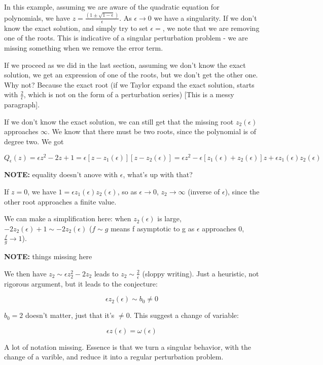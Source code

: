\documentclass[12pt]{report}
\begin{document}
In this example, assuming we are aware of the quadratic equation for
polynomials, we have $z = \frac{(1 \pm \sqrt{1-\epsilon})}{\epsilon}$. As
$\epsilon \to 0$ we have a singularity. If we don't know the exact solution, and
simply try to set $\epsilon=$, we note that we are removing one of the roots. This is indicative of a singular perturbation problem - we are missing something when we remove the error term.

If we proceed as we did in the last section, assuming we don't know the exact
solution, we get an expression of one of the roots, but we don't get the other
one. Why not? Because the exact root (if we Taylor expand the exact solution,
starts with $\frac 2 \epsilon$, which is not on the form of a perturbation
series) [This is a messy paragraph].

If we don't know the exact solution, we can still get that the missing root
$z_2(\epsilon)$ approaches $\infty$. We know that there must be two roots, since
the polynomial is of degree two. We got

$$Q_\epsilon(z) = \epsilon z^2 - 2z +1 = \epsilon[z - z_1(\epsilon)][z -
z_2(\epsilon)] = \epsilon z^2 - \epsilon [z_1(\epsilon) + z_2(\epsilon)]z +
\epsilon z_1(\epsilon)z_2(\epsilon)$$

\textbf{NOTE:} equality doesn't anove with $\epsilon$, what's up with that?

If $z=0$, we have $1 = \epsilon z_1(\epsilon) z_2(\epsilon)$, so as $\epsilon
\to 0$, $z_2 \to \infty$ (inverse of $\epsilon$), since the other root approaches a finite value.

We can make a simplification here: when $z_2(\epsilon)$ is large, $-2
z_2(\epsilon) + 1 \sim -2 z_2(\epsilon)$ ($f \sim g$ means f asymptotic to g as
$\epsilon$ approaches 0, $\frac f g \to 1$).

\textbf{NOTE: }things missing here

We then have $z_2 \sim \epsilon z_2^2 - 2 z_2$ leads to $z_2 \sim \frac 2 \epsilon$
(sloppy writing). Just a heuristic, not rigorous argument, but it leads to the
conjecture:

$$\epsilon z_2(\epsilon) \sim b_0 \neq 0$$

$b_0 = 2$ doesn't matter, just that it's $\neq 0$. This suggest a change of
variable:

$$\epsilon z (\epsilon) = \omega (\epsilon)$$

A lot of notation missing. Essence is that we turn a singular behavior, with the
change of a varible, and reduce it into a regular perturbation problem.
\end{document}

